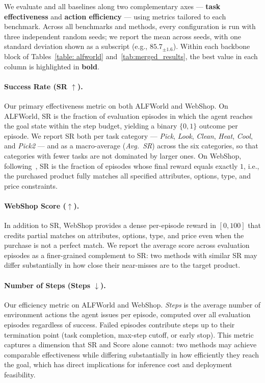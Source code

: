 We evaluate \ours{} and all baselines along two complementary axes --- \textbf{task effectiveness} and \textbf{action efficiency} --- using metrics tailored to each benchmark. Across all benchmarks and methods, every configuration is run with three independent random seeds; we report the mean across seeds, with one standard deviation shown as a subscript (e.g., $85.7_{\pm 1.6}$). Within each backbone block of Tables~\ref{table: alfworld} and~\ref{tab:merged_results}, the best value in each column is highlighted in \textbf{bold}.

\paragraph{Success Rate (SR $\uparrow$).}
Our primary effectiveness metric on both ALFWorld and WebShop. On ALFWorld, SR is the fraction of evaluation episodes in which the agent reaches the goal state within the step budget, yielding a binary $\{0, 1\}$ outcome per episode. We report SR both per task category --- \textit{Pick}, \textit{Look}, \textit{Clean}, \textit{Heat}, \textit{Cool}, and \textit{Pick2} --- and as a macro-average (\textit{Avg.\ SR}) across the six categories, so that categories with fewer tasks are not dominated by larger ones. On WebShop, following~\citep{10.5555/3600270.3601778}, SR is the fraction of episodes whose final reward equals exactly $1$, i.e., the purchased product fully matches all specified attributes, options, type, and price constraints.

\paragraph{WebShop Score ($\uparrow$).}
In addition to SR, WebShop provides a dense per-episode reward in $[0, 100]$ that credits partial matches on attributes, options, type, and price even when the purchase is not a perfect match. We report the average score across evaluation episodes as a finer-grained complement to SR: two methods with similar SR may differ substantially in how close their near-misses are to the target product.

\paragraph{Number of Steps (Steps $\downarrow$).}
Our efficiency metric on ALFWorld and WebShop. \textit{Steps} is the average number of environment actions the agent issues per episode, computed over all evaluation episodes regardless of success. Failed episodes contribute steps up to their termination point (task completion, max-step cutoff, or early stop). This metric captures a dimension that SR and Score alone cannot: two methods may achieve comparable effectiveness while differing substantially in how efficiently they reach the goal, which has direct implications for inference cost and deployment feasibility.

